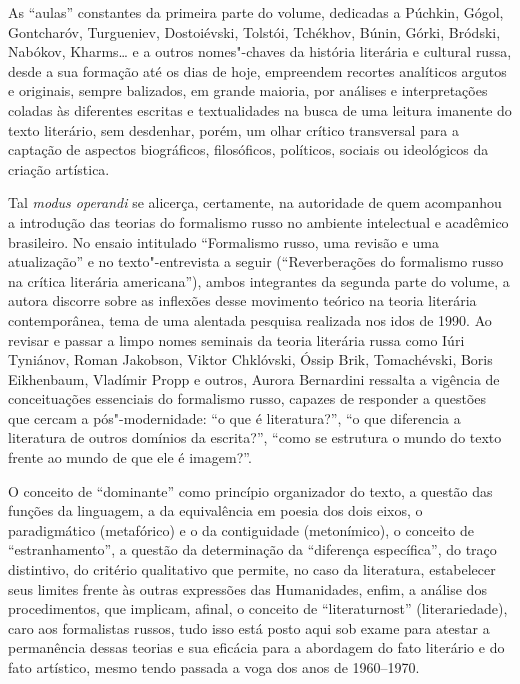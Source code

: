 As ``aulas'' constantes da primeira parte do volume, dedicadas a
Púchkin, Gógol, Gontcharóv, Turgueniev, Dostoiévski, Tolstói, Tchékhov,
Búnin, Górki, Bródski, Nabókov, Kharms\ldots{} e a outros nomes"-chaves da
história literária e cultural russa, desde a sua formação até os dias de
hoje, empreendem recortes analíticos argutos e originais, sempre
balizados, em grande maioria, por análises e interpretações coladas às
diferentes escritas e textualidades na busca de uma leitura imanente do
texto literário, sem desdenhar, porém, um olhar crítico transversal para
a captação de aspectos biográficos, filosóficos, políticos, sociais ou
ideológicos da criação artística.

Tal \emph{modus operandi} se alicerça, certamente, na autoridade de quem
acompanhou a introdução das teorias do formalismo russo no ambiente
intelectual e acadêmico brasileiro. No ensaio intitulado ``Formalismo
russo, uma revisão e uma atualização'' e no texto"-entrevista a seguir
(``Reverberações do formalismo russo na crítica literária americana''),
ambos integrantes da segunda parte do volume, a autora discorre sobre as
inflexões desse movimento teórico na teoria literária contemporânea,
tema de uma alentada pesquisa realizada nos idos de 1990. Ao revisar e
passar a limpo nomes seminais da teoria literária russa como Iúri
Tyniánov, Roman Jakobson, Viktor Chklóvski, Óssip Brik, Tomachévski,
Boris Eikhenbaum, Vladímir Propp e outros, Aurora Bernardini ressalta a
vigência de conceituações essenciais do formalismo russo, capazes de
responder a questões que cercam a pós"-modernidade: ``o que é
literatura?'', ``o que diferencia a literatura de outros domínios da
escrita?'', ``como se estrutura o mundo do texto frente ao mundo de que
ele é imagem?''.

O conceito de ``dominante'' como princípio organizador do texto, a
questão das funções da linguagem, a da equivalência em poesia dos dois
eixos, o paradigmático (metafórico) e o da contiguidade (metonímico), o
conceito de ``estranhamento'', a questão da determinação da ``diferença
específica'', do traço distintivo, do critério qualitativo que permite,
no caso da literatura, estabelecer seus limites frente às outras
expressões das Humanidades, enfim, a análise dos procedimentos, que
implicam, afinal, o conceito de ``literaturnost'' (literariedade), caro
aos formalistas russos, tudo isso está posto aqui sob exame para atestar
a permanência dessas teorias e sua eficácia para a abordagem do fato
literário e do fato artístico, mesmo tendo passada a voga dos anos de
1960--1970.

